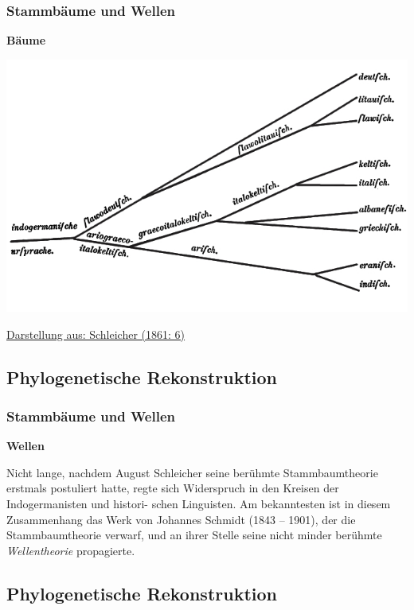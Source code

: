 \subsubsection{\texorpdfstring{{Stammbäume und
Wellen}}{Stammbäume und Wellen}}

\textbf{Bäume}

\href{img/schleicher1861.jpg}{\includegraphics{img/schleicher1861.jpg}}

\href{http://bibliography.lingpy.org?key=Schleicher1861}{Darstellung
aus: Schleicher (1861: 6)}

\subsection{\texorpdfstring{{Phylogenetische
Rekonstruktion}}{Phylogenetische Rekonstruktion}}

\subsubsection{\texorpdfstring{{Stammbäume und
Wellen}}{Stammbäume und Wellen}}

\textbf{Wellen}

Nicht lange, nachdem August Schleicher seine berühmte Stammbaumtheorie
erstmals postuliert hatte, regte sich Widerspruch in den Kreisen der
Indogermanisten und histori- schen Linguisten. Am bekanntesten ist in
diesem Zusammenhang das Werk von Johannes Schmidt (1843 -- 1901), der
die Stammbaumtheorie verwarf, und an ihrer Stelle seine nicht minder
berühmte \emph{Wellentheorie} propagierte.

\subsection{\texorpdfstring{{Phylogenetische
Rekonstruktion}}{Phylogenetische Rekonstruktion}}

